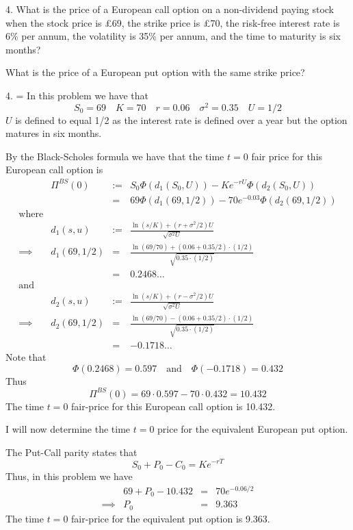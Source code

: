 \documentclass[11pt,a4paper]{article}
\begin{document}
\begin{question}{4.}
  What is the price of a European call option on a non-dividend paying stock when the stock price is £69, the strike price is £70, the risk-free interest rate is 6\% per annum, the volatility is 35\% per annum, and the time to maturity is six months?
  \par What is the price of a European put option with the same strike price?
\end{question}

\begin{answer}{4.}
  \everymath={\displaystyle}
  In this problem we have that
  \[ S_0=69\quad K=70\quad r=0.06\quad \sigma^2=0.35\quad U=1/2 \]
  $U$ is defined to equal 1/2 as the interest rate is defined over a year but the option matures in six months.
  \par By the Black-Scholes formula we have that the time $t=0$ fair price for this European call option is
  \[\begin{array}{rrrl}
    &\Pi^{BS}(0)&:=&S_0\Phi\left(d_1(S_0,U)\right)-Ke^{-rU}\Phi\left(d_2(S_0,U)\right)\\
    &&=&69\Phi\left(d_1(69,1/2)\right)-70e^{-0.03}\Phi\left(d_2(69,1/2)\right)\\
    \text{where}&\\
    &d_1(s,u)&:=&\frac{\ln(s/K)+(r+\sigma^2/2)U}{\sqrt{\sigma^2U}}\\
    \implies&d_1(69,1/2)&=&\frac{\ln(69/70)+(0.06+0.35/2)\cdot(1/2)}{\sqrt{0.35\cdot(1/2)}}\\
    &&=&0.2468\dots\\
    \text{and}\\
    &d_2(s,u)&:=&\frac{\ln(s/K)+(r-\sigma^2/2)U}{\sqrt{\sigma^2U}}\\
    \implies&d_2(69,1/2)&=&\frac{\ln(69/70)-(0.06+0.35/2)\cdot(1/2)}{\sqrt{0.35\cdot(1/2)}}\\
    &&=&-0.1718\dots
  \end{array}\]
  Note that
  \[ \Phi(0.2468)=0.597\quad\text{and}\quad\Phi(-0.1718)=0.432 \]
  Thus
  \[ \Pi^{BS}(0)=69\cdot0.597-70\cdot0.432=10.432 \]
  The time $t=0$ fair-price for this European call option is 10.432.
  \par I will now determine the time $t=0$ price for the equivalent European put option.
  \par The Put-Call parity states that
  \[ S_0+P_0-C_0=Ke^{-rT} \]
  Thus, in this problem we have
  \[\begin{array}{rrcl}
    &69+P_0-10.432&=&70e^{-0.06/2}\\
    \implies&P_0&=&9.363
  \end{array}\]
  The time $t=0$ fair-price for the equivalent put option is 9.363.
\end{answer}
\end{document}
